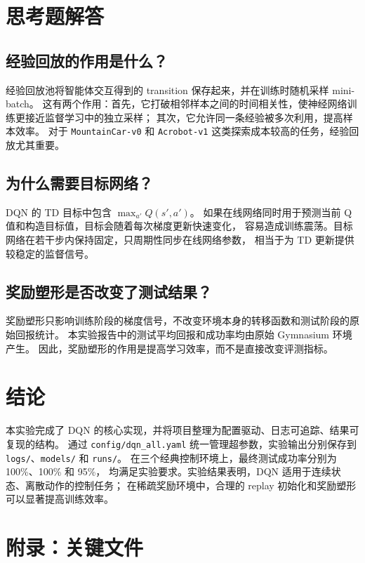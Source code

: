 \documentclass[UTF8,a4paper,12pt]{ctexart}
\begin{document}
\section{思考题解答}

\subsection{经验回放的作用是什么？}

经验回放池将智能体交互得到的 transition 保存起来，并在训练时随机采样 mini-batch。
这有两个作用：首先，它打破相邻样本之间的时间相关性，使神经网络训练更接近监督学习中的独立采样；
其次，它允许同一条经验被多次利用，提高样本效率。
对于 \texttt{MountainCar-v0} 和 \texttt{Acrobot-v1} 这类探索成本较高的任务，经验回放尤其重要。

\subsection{为什么需要目标网络？}

DQN 的 TD 目标中包含 $\max_{a'}Q(s',a')$。
如果在线网络同时用于预测当前 Q 值和构造目标值，目标会随着每次梯度更新快速变化，
容易造成训练震荡。目标网络在若干步内保持固定，只周期性同步在线网络参数，
相当于为 TD 更新提供较稳定的监督信号。

\subsection{奖励塑形是否改变了测试结果？}

奖励塑形只影响训练阶段的梯度信号，不改变环境本身的转移函数和测试阶段的原始回报统计。
本实验报告中的测试平均回报和成功率均由原始 Gymnasium 环境产生。
因此，奖励塑形的作用是提高学习效率，而不是直接改变评测指标。

\section{结论}

本实验完成了 DQN 的核心实现，并将项目整理为配置驱动、日志可追踪、结果可复现的结构。
通过 \texttt{config/dqn\_all.yaml} 统一管理超参数，实验输出分别保存到
\texttt{logs/}、\texttt{models/} 和 \texttt{runs/}。
在三个经典控制环境上，最终测试成功率分别为 100\%、100\% 和 95\%，
均满足实验要求。实验结果表明，DQN 适用于连续状态、离散动作的控制任务；
在稀疏奖励环境中，合理的 replay 初始化和奖励塑形可以显著提高训练效率。

\appendix
\section{附录：关键文件}
\end{document}
